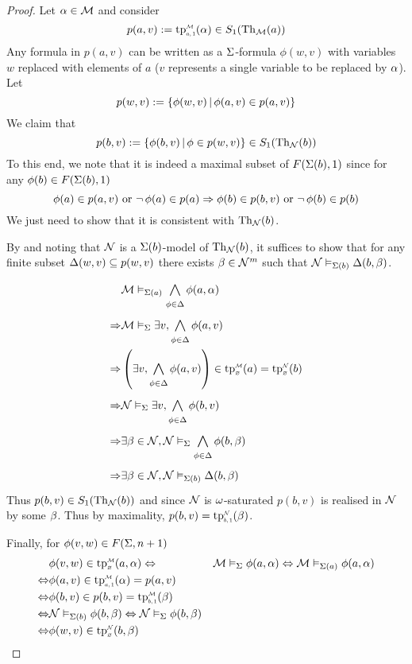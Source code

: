 \begin{proof}
    Let $\alpha \in \mathcal{M}$ and consider 
    \[p(a,v) := \subintp{a,1}{\MM}{\tp}(\al) \in S_1(\Theory_\MM(a))\]
    Any formula in $p(a,v)$ can be written as a 
    $\Sigma$-formula $\phi(w,v)$ with variables $w$
    replaced with elements of $a$ 
    ($v$ represents a single variable to be replaced by $\alpha$). 
    Let 
    \[p(w,v) := \left\{\phi(w,v) \,|\, \phi(a,v) \in p(a,v)\right\}\]
    We claim that 
    \[p(b,v) := \left\{\phi(b,v) \,|\, \phi \in p(w,v)\right\} \in S_1(\mathrm{Th}_{\mathcal{N}}(b))\]
    To this end, we note that it is indeed 
    a maximal subset of $F(\Sigma(b),1)$ since for any $\phi(b) \in F(\Sigma(b),1)$
    \[\phi(a) \in p(a,v) \text{ or } \neg\, \phi(a) \in p(a) \Rightarrow 
    \phi(b) \in p(b,v) \text{ or } \neg\, \phi(b) \in p(b)\]
    We just need to show that it is consistent with $\mathrm{Th}_{\mathcal{N}}(b)$.

    By  
    and noting that $\mathcal{N}$ is a $\Sigma(b)$-model of $\mathrm{Th}_{\mathcal{N}}(b)$,
    it suffices to show
    that for any finite subset $\Delta(w,v) \subseteq p(w,v)$ 
    there exists $\beta \in \mathcal{N}^m$ such that 
    $\mathcal{N} \vDash_{\Sigma(b)} \Delta(b,\beta)$.
    \begin{align*}
        &\MM \model{\Si(a)} \bigand{\phi \in \De}{} \phi(a,\al)\\
        \implies &\MM \model{\Si} \exists v, \bigand{\phi \in \De}{} \phi(a,v)\\
        \implies &\brkt{\exists v, \bigand{\phi \in \De}{} \phi(a,v)} \in 
        \subintp{\nothing}{\MM}{\tp}(a) = 
        \subintp{\nothing}{\NN}{\tp}(b)\\
        \implies &\NN \modelsi \exists v, \bigand{\phi \in \De}{} \phi(b,v)\\
        \implies &\exists \be \in \NN, 
        \NN \modelsi \bigand{\phi \in \De}{} \phi(b,\be)\\
        \implies &\exists \be \in \NN, \NN \model{\Si(b)} \De(b,\be)
    \end{align*}
    Thus $p(b,v)\in S_1(\mathrm{Th}_{\mathcal{N}}(b))$ and since $\mathcal{N}$ is $\omega$-saturated
    $p(b,v)$ is realised in $\mathcal{N}$ by some $\beta$.
    Thus by maximality, $p(b,v) = \subintp{b,1}{\NN}{\tp}(\be)$.

    Finally, for $\phi(v,w) \in F(\Sigma,n+1)$
    \begin{align*}
        &\phi(v,w) \in \subintp{\nothing}{\MM}{\tp}(a,\al)
        \iff &\MM \model{\Si} \phi(a,\al) \iff \MM \model{\Si(a)} \phi(a,\al)\\
        \iff &\phi(a,v) \in \subintp{a,1}{\MM}{\tp}(\al) = p(a,v)\\
        \iff &\phi(b,v) \in p(b,v) = \subintp{b,1}{\MM}{\tp}(\be)\\
        \iff &\NN \model{\Si(b)} \phi(b,\be) \iff \NN \modelsi \phi(b,\be)\\
        \iff &\phi(w,v) \in \subintp{\nothing}{\NN}{\tp}(b,\be)
    \end{align*}
\end{proof}

